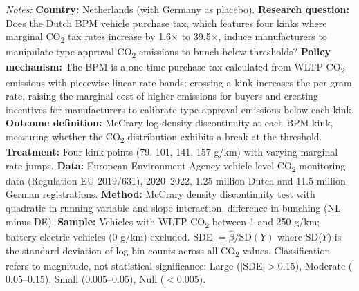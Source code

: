\begin{table}[t]
\begin{threeparttable}
\begin{tablenotes}
\item \textit{Notes:} \textbf{Country:} Netherlands (with Germany as placebo). \textbf{Research question:} Does the Dutch BPM vehicle purchase tax, which features four kinks where marginal CO\textsubscript{2} tax rates increase by 1.6$\times$ to 39.5$\times$, induce manufacturers to manipulate type-approval CO\textsubscript{2} emissions to bunch below thresholds? \textbf{Policy mechanism:} The BPM is a one-time purchase tax calculated from WLTP CO\textsubscript{2} emissions with piecewise-linear rate bands; crossing a kink increases the per-gram rate, raising the marginal cost of higher emissions for buyers and creating incentives for manufacturers to calibrate type-approval emissions below each kink. \textbf{Outcome definition:} McCrary log-density discontinuity at each BPM kink, measuring whether the CO\textsubscript{2} distribution exhibits a break at the threshold. \textbf{Treatment:} Four kink points (79, 101, 141, 157 g/km) with varying marginal rate jumps. \textbf{Data:} European Environment Agency vehicle-level CO\textsubscript{2} monitoring data (Regulation EU 2019/631), 2020--2022, 1.25 million Dutch and 11.5 million German registrations. \textbf{Method:} McCrary density discontinuity test with quadratic in running variable and slope interaction, difference-in-bunching (NL minus DE). \textbf{Sample:} Vehicles with WLTP CO\textsubscript{2} between 1 and 250 g/km; battery-electric vehicles (0 g/km) excluded. SDE $= \hat{\beta} / \text{SD}(Y)$ where SD($Y$) is the standard deviation of log bin counts across all CO\textsubscript{2} values. Classification refers to magnitude, not statistical significance: Large ($|$SDE$| > 0.15$), Moderate ($0.05$--$0.15$), Small ($0.005$--$0.05$), Null ($< 0.005$).
\end{tablenotes}
\end{threeparttable}
\end{table}

